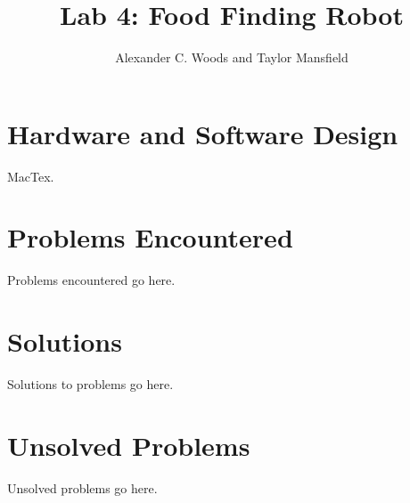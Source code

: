 \documentclass[journal]{IEEEtran}
\begin{document}
\title{\LARGE \bf Lab 4: Food Finding Robot}

\author{Alexander C. Woods and Taylor Mansfield}


\maketitle

\section{Hardware and Software Design}\label{S.design}
 MacTex.

\section{Problems Encountered}\label{S.problems}
Problems encountered go here.

\section{Solutions}\label{S.solutions}
Solutions to problems go here.

\section{Unsolved Problems}\label{S.unsolved}
Unsolved problems go here.
\end{document}
